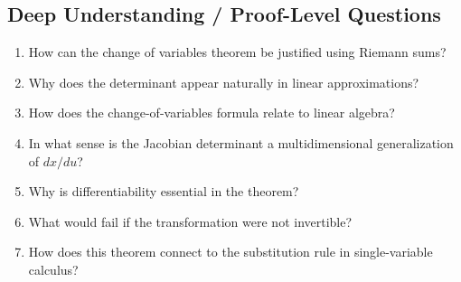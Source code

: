 \subsection{Deep Understanding / Proof-Level Questions}
\begin{enumerate}[resume]
  \item How can the change of variables theorem be justified using Riemann sums?
  \item Why does the determinant appear naturally in linear approximations?
  \item How does the change-of-variables formula relate to linear algebra?
  \item In what sense is the Jacobian determinant a multidimensional generalization of $dx/du$?
  \item Why is differentiability essential in the theorem?
  \item What would fail if the transformation were not invertible?
  \item How does this theorem connect to the substitution rule in single-variable calculus?
\end{enumerate}

